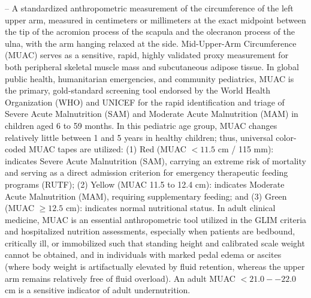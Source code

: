 -- A standardized anthropometric measurement of the circumference of the left upper arm, measured in centimeters or millimeters at the exact midpoint between the tip of the acromion process of the scapula and the olecranon process of the ulna, with the arm hanging relaxed at the side. Mid-Upper-Arm Circumference (MUAC) serves as a sensitive, rapid, highly validated proxy measurement for both peripheral skeletal muscle mass and subcutaneous adipose tissue. In global public health, humanitarian emergencies, and community pediatrics, MUAC is the primary, gold-standard screening tool endorsed by the World Health Organization (WHO) and UNICEF for the rapid identification and triage of Severe Acute Malnutrition (SAM) and Moderate Acute Malnutrition (MAM) in children aged 6 to 59 months. In this pediatric age group, MUAC changes relatively little between 1 and 5 years in healthy children; thus, universal color-coded MUAC tapes are utilized: (1) Red (MUAC $<11.5$ cm / 115 mm): indicates Severe Acute Malnutrition (SAM), carrying an extreme risk of mortality and serving as a direct admission criterion for emergency therapeutic feeding programs (RUTF); (2) Yellow (MUAC 11.5 to 12.4 cm): indicates Moderate Acute Malnutrition (MAM), requiring supplementary feeding; and (3) Green (MUAC $\ge 12.5$ cm): indicates normal nutritional status. In adult clinical medicine, MUAC is an essential anthropometric tool utilized in the GLIM criteria and hospitalized nutrition assessments, especially when patients are bedbound, critically ill, or immobilized such that standing height and calibrated scale weight cannot be obtained, and in individuals with marked pedal edema or ascites (where body weight is artifactually elevated by fluid retention, whereas the upper arm remains relatively free of fluid overload). An adult MUAC $<21.0--22.0$ cm is a sensitive indicator of adult undernutrition.


